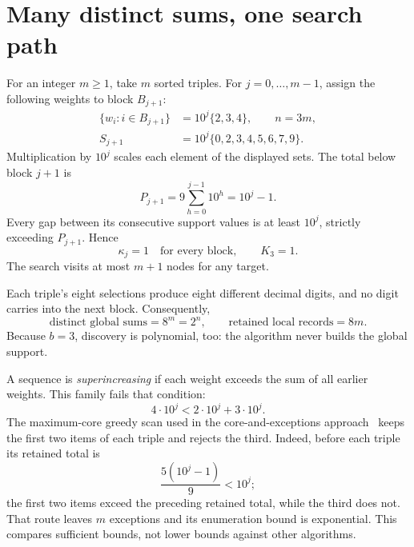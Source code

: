 \documentclass[10pt]{article}
\begin{document}
\section{Many distinct sums, one search path}
For an integer $m\ge1$, take $m$ sorted triples. For $j=0,\ldots,m-1$,
assign the following weights to block $B_{j+1}$:
\begin{equation}\label{eq:family}
 \begin{aligned}
 \{w_i:i\in B_{j+1}\}&=10^j\{2,3,4\},\qquad n=3m,\\
 S_{j+1}&=10^j\{0,2,3,4,5,6,7,9\}.
 \end{aligned}
\end{equation}
Multiplication by $10^j$ scales each element of the displayed sets.
The total below block $j+1$ is
\[
 P_{j+1}=9\sum_{h=0}^{j-1}10^h=10^j-1.
\]
Every gap between its consecutive support values is at least $10^j$,
strictly exceeding $P_{j+1}$. Hence
\[
 \kappa_j=1\quad\text{for every block},\qquad K_3=1.
\]
The search visits at most $m+1$ nodes for any target.

Each triple's eight selections produce eight different decimal digits,
and no digit carries into the next block. Consequently,
\[
 \text{distinct global sums}=8^m=2^n,\qquad
 \text{retained local records}=8m.
\]
Because $b=3$, discovery is polynomial, too:
the algorithm never builds the global support.

A sequence is \emph{superincreasing} if each weight exceeds the sum of
all earlier weights. This family fails that condition:
\[
 4\cdot10^j<2\cdot10^j+3\cdot10^j.
\]
The maximum-core greedy scan used in the
core-and-exceptions approach~\cite{core} keeps the first two items of each
triple and rejects the third. Indeed, before each triple its retained total
is
\[
 \frac{5(10^j-1)}{9}<10^j;
\]
the first two items exceed the preceding retained
total, while the third does not. That route leaves $m$ exceptions and its
enumeration bound is exponential. This compares sufficient bounds, not
lower bounds against other algorithms.
\end{document}
